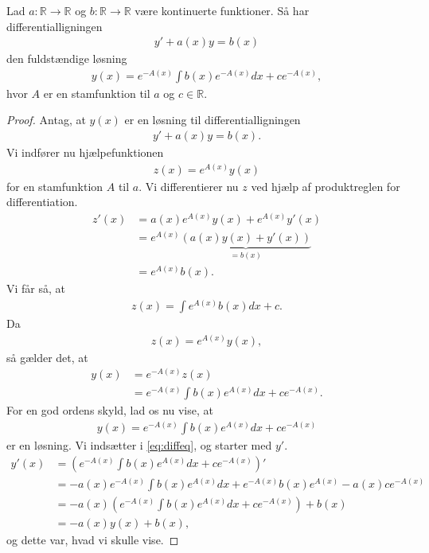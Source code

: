 \begin{setn}[Panserformlen]
	Lad $a:\mathbb{R} \to \mathbb{R}$ og $b:\mathbb{R} \to \mathbb{R}$ være kontinuerte funktioner.
	Så har differentialligningen
	\begin{align*}
		y' + a(x) y =b(x)
	\end{align*}
	den fuldstændige løsning
	\begin{align*}
		y(x) = e^{-A(x)}\int b(x)e^{-A(x)} dx + ce^{-A(x)},
	\end{align*}
	hvor $A$ er en stamfunktion til $a$ og $c\in \mathbb{R}$.
\end{setn}
\begin{proof}
	Antag, at $y(x)$ er en løsning til differentialligningen
	\begin{align}\label{eq:diffeq}
		y' + a(x)y = b(x).
	\end{align}
	Vi indfører nu hjælpefunktionen 
	\begin{align*}
		z(x) = e^{A(x)}y(x)
	\end{align*}
	for en stamfunktion $A$ til $a$. 
	Vi differentierer nu $z$ ved hjælp af produktreglen for differentiation.
	\begin{align*}
		z'(x) &= a(x)e^{A(x)}y(x)+e^{A(x)}y'(x)\\
			  &= e^{A(x)}\underbrace{\left(a(x)y(x)+y'(x)\right)}_{=b(x)} \\
			  &= e^{A(x)}b(x).
	\end{align*}
	Vi får så, at 
	\begin{align*}
		z(x) = \int e^{A(x)}b(x) dx + c.
	\end{align*}
	Da 
	\begin{align*}
		z(x) = e^{A(x)}y(x),
	\end{align*}
	så gælder det, at 
	\begin{align*}
		y(x) &= e^{-A(x)}z(x)\\
		&= e^{-A(x)}\int b(x)e^{A(x)} dx + ce^{-A(x)}.
	\end{align*}
	For en god ordens skyld, lad os nu vise, at 
	\begin{align*}
		y(x) = e^{-A(x)}\int b(x)e^{A(x)}dx + ce^{-A(x)}
	\end{align*}
	er en løsning. 
	Vi indsætter i \eqref{eq:diffeq}, og starter med $y'$.
	\begin{align*}
		y'(x) &= \left(e^{-A(x)}\int b(x)e^{A(x)}dx + ce^{-A(x)}\right)' \\
		&=-a(x)e^{-A(x)}\int b(x)e^{A(x)}dx + e^{-A(x)}b(x)e^{A(x)} -a(x)ce^{-A(x)} \\
		&= -a(x)\left(e^{-A(x)}\int b(x)e^{A(x)}dx + ce^{-A(x)}\right) + b(x) \\
		&= -a(x)y(x) + b(x),
	\end{align*}
	og dette var, hvad vi skulle vise. 
\end{proof}

